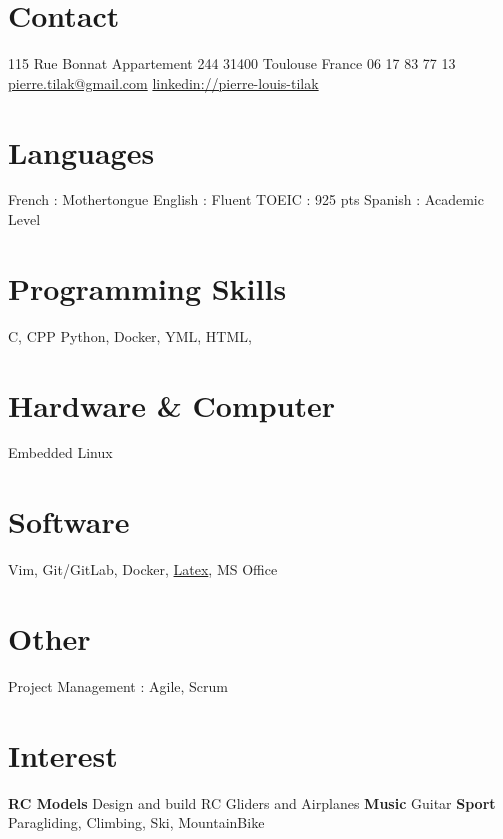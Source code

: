 \documentclass[a4paper]{friggeri-cv} %
\begin{document}


\begin{aside} %
\section{Contact}
115 Rue Bonnat
Appartement 244
31400 Toulouse
France
06 17 83 77 13
~
\href{mailto:pierre.tilak@gmail.com}{pierre.tilak@gmail.com}
\href{https://www.linkedin.com/pub/pierre-louis-tilak/96/162/a83}{linkedin://pierre-louis-tilak}
\section{Languages}
French : Mothertongue
English : Fluent
TOEIC : 925 pts 
Spanish : Academic Level\bigskip\bigskip
\section{Programming Skills}
C, CPP
Python, 
Docker, YML,
HTML,\bigskip\bigskip
\section{Hardware \& Computer}
Embedded Linux\bigskip\bigskip
\section{Software}
Vim, Git/GitLab, Docker, \href{https://github.com/tilaktilak/CV}{Latex}, MS Office\bigskip\bigskip
\section{Other}
Project Management : Agile, Scrum	\bigskip\bigskip
\section{Interest}
\textbf{RC Models} Design and build RC Gliders and Airplanes
\textbf{Music} Guitar
\textbf{Sport} Paragliding, Climbing, Ski, MountainBike
\end{aside}

\end{document}
